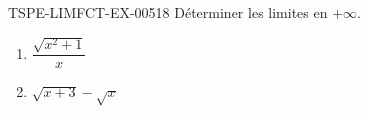 \begin{exercice}{TSPE-LIMFCT-EX-005}{1}{8}
Déterminer les limites en $+\infty$.
\begin{enumerate}
  \item $\dfrac{\sqrt{x^2 + 1}}{x}$
  \item $\sqrt{x+3} - \sqrt{x}$
\end{enumerate}
\end{exercice}
